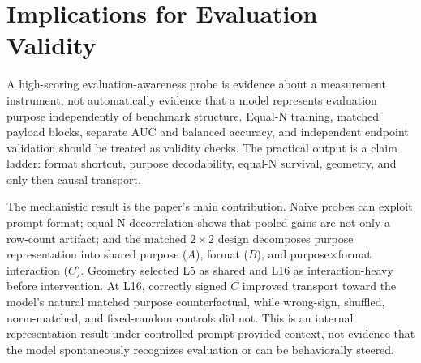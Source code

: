 \section{Implications for Evaluation Validity}
A high-scoring evaluation-awareness probe is evidence about a measurement instrument, not automatically evidence that a model represents evaluation purpose independently of benchmark structure. Equal-N training, matched payload blocks, separate AUC and balanced accuracy, and independent endpoint validation should be treated as validity checks. The practical output is a claim ladder: format shortcut, purpose decodability, equal-N survival, geometry, and only then causal transport.

The mechanistic result is the paper's main contribution. Naive probes can exploit prompt format; equal-N decorrelation shows that pooled gains are not only a row-count artifact; and the matched $2\times2$ design decomposes purpose representation into shared purpose ($A$), format ($B$), and purpose$\times$format interaction ($C$). Geometry selected L5 as shared and L16 as interaction-heavy before intervention. At L16, correctly signed $C$ improved transport toward the model's natural matched purpose counterfactual, while wrong-sign, shuffled, norm-matched, and fixed-random controls did not. This is an internal representation result under controlled prompt-provided context, not evidence that the model spontaneously recognizes evaluation or can be behaviorally steered.
